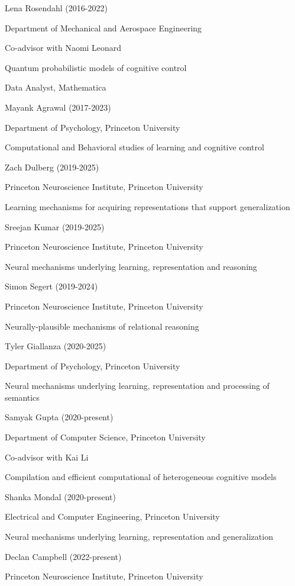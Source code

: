 \documentclass[10 pt]{article}
\begin{document}
Lena Rosendahl (2016-2022)

Department of Mechanical and Aerospace Engineering

Co-advisor with Naomi Leonard

Quantum probabilistic models of cognitive control

Data Analyst, Mathematica
    \medskip

Mayank Agrawal (2017-2023)

Department of Psychology, Princeton University

Computational and Behavioral studies of learning and cognitive control
    \medskip

Zach Dulberg (2019-2025)

Princeton Neuroscience Institute, Princeton University

Learning mechanisms for acquiring representations that support generalization
    \medskip

Sreejan Kumar (2019-2025)

Princeton Neuroscience Institute, Princeton University

Neural mechanisms underlying learning, representation and reasoning
    \medskip

Simon Segert (2019-2024)

Princeton Neuroscience Institute, Princeton University

Neurally-plausible mechanisms of relational reasoning
    \medskip

Tyler Giallanza (2020-2025)

Department of Psychology, Princeton University

Neural mechanisms underlying learning, representation and processing of semantics
    \medskip

Samyak Gupta (2020-present)

Department of Computer Science, Princeton University

Co-advisor with Kai Li

Compilation and efficient computational of heterogeneous cognitive models
    \medskip

Shanka Mondal (2020-present)

Electrical and Computer Engineering, Princeton University

Neural mechanisms underlying learning, representation and generalization
    \medskip

Declan Campbell (2022-present)

Princeton Neuroscience Institute, Princeton University
\end{document}
